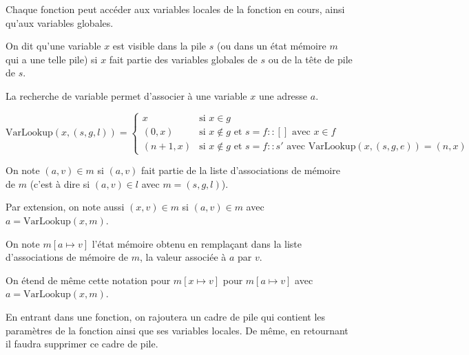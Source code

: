 Chaque fonction peut accéder aux variables locales de la fonction en cours,
ainsi qu'aux variables globales.

\begin{definition}[Visibilité]
  On dit qu'une variable $x$ est visible dans la pile $s$ (ou dans un état
  mémoire $m$ qui a une telle pile) si $x$ fait partie des variables globales de
  $s$ ou de la tête de pile de $s$.
\end{definition}

\begin{definition}

  La recherche de variable permet d'associer à une variable $x$ une adresse $a$.

  \[
    \mathrm{VarLookup} (x, (s, g, l)) =
      \begin{cases}
        x      & \mbox{si } x ∈ g \\
      (0, x)   & \mbox{si } x ∉ g \mbox{ et } s = f::[]
                 \mbox{ avec } x ∈ f \\
      (n+1, x) & \mbox{si } x ∉ g \mbox{ et } s = f::s'
                 \mbox{ avec } \mathrm{VarLookup} (x, (s, g, e)) = (n, x)
      \end{cases}
  \]

\end{definition}

\begin{definition}

  On note $(a, v) ∈ m$ si $(a, v)$ fait partie de la liste d'associations de
  mémoire de $m$ (c'est à dire si $(a, v) ∈ l$ avec $m = (s, g, l)$).

  Par extension, on note aussi $(x, v) ∈ m$ si $(a, v) ∈ m$ avec $a =
  \mathrm{VarLookup}(x, m)$.

  On note $m[a ↦ v]$ l'état mémoire obtenu en remplaçant dans la liste
  d'associations de mémoire de $m$, la valeur associée à $a$ par $v$.

  On étend de même cette notation pour $m[x ↦ v]$ pour $m[a ↦ v]$ avec
  $a = \mathrm{VarLookup}(x, m)$.

\end{definition}

En entrant dans une fonction, on rajoutera un cadre de pile qui contient les
paramètres de la fonction ainsi que ses variables locales. De même, en
retournant il faudra supprimer ce cadre de pile.

